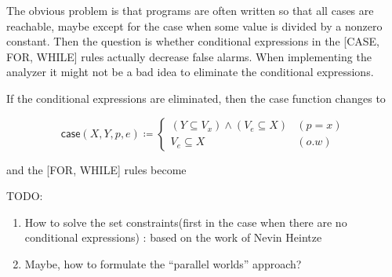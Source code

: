 \documentclass{article}
\begin{document}
The obvious problem is that programs are often written so that all cases are reachable, maybe except for the case when some value is divided by a nonzero constant. Then the question is whether conditional expressions in the [CASE, FOR, WHILE] rules actually decrease false alarms. When implementing the analyzer it might not be a bad idea to eliminate the conditional expressions.

If the conditional expressions are eliminated, then the case function changes to

\[
\mathsf{case}(X,Y,p,e)\coloneq
\begin{cases}
  (Y\subseteq V_{x})\wedge (V_{e}\subseteq X) & (p=x)\\
  V_{e} \subseteq X & (o.w)
\end{cases}
\]

and the [FOR, WHILE] rules become

\begin{center}
\begin{prooftree}
\end{prooftree}
\vspace{0.2cm}

\begin{prooftree}
\end{prooftree}
\end{center}

TODO:
\begin{enumerate}
  \item How to solve the set constraints(first in the case when there are no conditional expressions) : based on the work of Nevin Heintze\cite{Hei91}
  \item Maybe, how to formulate the ``parallel worlds'' approach?
\end{enumerate}
\printbibliography
\end{document}
